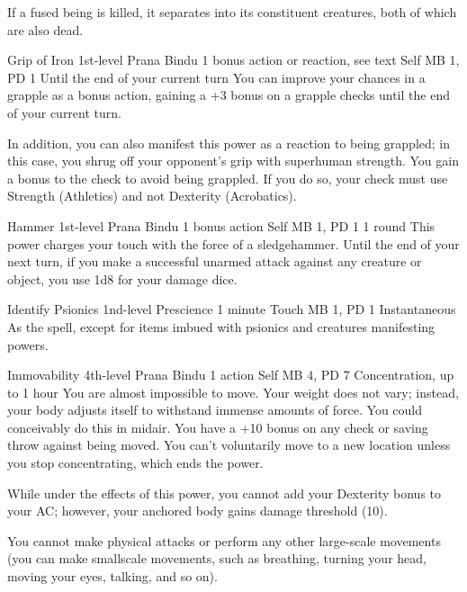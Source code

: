  If a fused being is killed,
  it separates into its constituent creatures,
  both of which are also dead.

\DndPowerHeader%
  {Grip of Iron}
  {1st-level Prana Bindu}
  {1 bonus action or reaction, see text}
  {Self}
  {MB 1, PD 1}
  {Until the end of your current turn}
  You can improve your chances in a grapple as a bonus action,
  gaining a +3 bonus on a grapple checks until
  the end of your current turn.

  In addition, you can also manifest this power
  as a reaction to being grappled; in this case, you shrug
  off your opponent's grip with superhuman strength.
  You gain a bonus to the check to avoid being grappled.
  If you do so,
  your check must use Strength (Athletics) and not
  Dexterity (Acrobatics).

\DndPowerHeader%
  {Hammer}
  {1st-level Prana Bindu}
  {1 bonus action}
  {Self}
  {MB 1, PD 1}
  {1 round}
This power charges your touch with the force of a sledgehammer.
Until the end of your next turn,
if you make a successful unarmed attack against any creature or object,
you use 1d8 for your damage dice.

\DndPowerHeader%
  {Identify Psionics}
  {1nd-level Prescience}
  {1 minute}
  {Touch}
  {MB 1, PD 1}
  {Instantaneous}
As the  spell,
except for items imbued with psionics
and creatures manifesting powers.

\DndPowerHeader%
  {Immovability}
  {4th-level Prana Bindu}
  {1 action}
  {Self}
  {MB 4, PD 7}
  {Concentration, up to 1 hour}
  You are almost impossible to move.
  Your weight does not vary;
  instead, your body adjusts itself to withstand
  immense amounts of force.
  You could conceivably do this in midair.
  You have a +10 bonus on any check or saving throw
  against being moved.
  You can't voluntarily move to a new location
  unless you stop concentrating, which ends the power.

  While under the effects of this power,
  you cannot add your Dexterity bonus to your AC;
  however, your anchored body gains damage threshold (10).
  
  You cannot make physical attacks
  or perform any other large-scale movements
  (you can make smallscale movements,
  such as breathing,
  turning your head,
  moving your eyes,
  talking, and so on).

